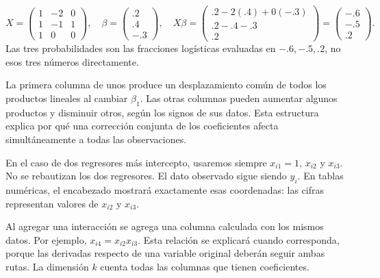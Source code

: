 \documentclass[11pt,a4paper]{article}
\begin{document}
\begin{ejemplo}
\[
X=\begin{pmatrix}1&-2&0\\1&-1&1\\1&0&0\end{pmatrix},
\quad
\beta=\begin{pmatrix}.2\\.4\\-.3\end{pmatrix},
\quad
X\beta=\begin{pmatrix}.2-2(.4)+0(-.3)\\.2-.4-.3\\.2\end{pmatrix}
=\begin{pmatrix}-.6\\-.5\\.2\end{pmatrix}.
\]
Las tres probabilidades son las fracciones logísticas evaluadas en
$-.6,-.5,.2$, no esos tres números directamente.
\end{ejemplo}
La primera columna de unos produce un desplazamiento común de todos
los productos lineales al cambiar $\beta_1$.
Las otras columnas pueden aumentar algunos productos y disminuir otros,
según los signos de sus datos.
Esta estructura explica por qué una corrección conjunta de los
coeficientes afecta simultáneamente a todas las observaciones.

En el caso de dos regresores más intercepto, usaremos siempre
$x_{i1}=1$, $x_{i2}$ y $x_{i3}$. No se rebautizan los dos regresores.
El dato observado sigue siendo $y_i$.
En tablas numéricas, el encabezado mostrará exactamente esas coordenadas:
las cifras representan valores de $x_{i2}$ y $x_{i3}$.

Al agregar una interacción se agrega una columna calculada con
los mismos datos. Por ejemplo, $x_{i4}=x_{i2}x_{i3}$.
Esta relación se explicará cuando corresponda, porque las derivadas
respecto de una variable original deberán seguir ambas rutas.
La dimensión $k$ cuenta todas las columnas que tienen coeficientes.

\clearpage
\end{document}
